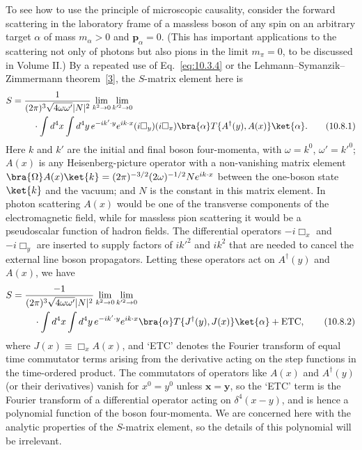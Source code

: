 To see how to use the principle of microscopic causality, consider the
forward scattering in the laboratory frame of a massless boson of any spin on
an arbitrary target $\alpha$ of mass $m_\alpha>0$ and $\mathbf p_\alpha=0$.
(This has important applications to the scattering not only of photons but
also pions in the limit $m_\pi=0$, to be discussed in Volume II.) By a repeated
use of Eq.~\eqref{eq:10.3.4} or the Lehmann--Symanzik--Zimmermann
theorem~\hyperref[ref:10.3]{[3]}, the $S$-matrix element here is
\begin{align}
  S={}&\frac{1}{(2\pi)^3\sqrt{4\omega\omega'}|N|^2}
  \lim_{k^2\to0}\lim_{k'^2\to0}\notag\\
  &\quad\cdot\int d^4x\int d^4y\,e^{-ik'\cdot y}e^{ik\cdot x}
  (i\Box_y)(i\Box_x)
  \bra{\alpha}T\{A^\dagger(y),A(x)\}\ket{\alpha}.
  \tag{10.8.1}\label{eq:10.8.1}
\end{align}
Here $k$ and $k'$ are the initial and final boson four-momenta, with
$\omega=k^0$, $\omega'=k'^0$; $A(x)$ is any Heisenberg-picture operator
with a non-vanishing matrix element
$\bra{\Omega}A(x)\ket{k}=(2\pi)^{-3/2}(2\omega)^{-1/2}Ne^{ik\cdot x}$
between the one-boson state $\ket{k}$ and the vacuum; and $N$ is the
constant in this matrix element. In photon scattering $A(x)$ would be one
of the transverse components of the electromagnetic field, while for massless
pion scattering it would be a pseudoscalar function of hadron fields. The
differential operators $-i\Box_x$ and $-i\Box_y$ are inserted to supply
factors of $ik'^2$ and $ik^2$ that are needed to cancel the external line
boson propagators. Letting these operators act on $A^\dagger(y)$ and $A(x)$,
we have
\begin{align}
  S={}&\frac{-1}{(2\pi)^3\sqrt{4\omega\omega'}|N|^2}
  \lim_{k^2\to0}\lim_{k'^2\to0}\notag\\
  &\quad\cdot\int d^4x\int d^4y\,e^{-ik'\cdot y}e^{ik\cdot x}
  \bra{\alpha}T\{J^\dagger(y),J(x)\}\ket{\alpha}+\mathrm{ETC},
  \tag{10.8.2}\label{eq:10.8.2}
\end{align}
where $J(x)\equiv\Box_xA(x)$, and `ETC' denotes the Fourier transform
of equal time commutator terms arising from the derivative acting on the
step functions in the time-ordered product. The commutators of operators
like $A(x)$ and $A^\dagger(y)$ (or their derivatives) vanish for $x^0=y^0$
unless $\mathbf{x}=\mathbf{y}$, so the `ETC' term is the Fourier transform
of a differential operator acting on $\delta^4(x-y)$, and is hence a
polynomial function of the boson four-momenta. We are concerned here with
the analytic properties of the $S$-matrix element, so the details of this
polynomial will be irrelevant.

